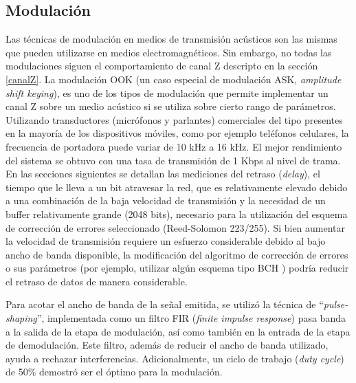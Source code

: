 \subsection{Modulación}
Las técnicas de modulación en medios de transmisión acústicos son las mismas que pueden utilizarse en medios electromagnéticos.
Sin embargo, no todas las modulaciones siguen el comportamiento de canal Z descripto en la sección \ref{canalZ}.
La modulación OOK (un caso especial de modulación ASK, \textit{amplitude shift keying}), es uno de los tipos de modulación que permite implementar un canal Z sobre un medio acústico si se utiliza sobre cierto rango de parámetros. Utilizando transductores (micrófonos y parlantes) comerciales del tipo presentes en la mayoría de los dispositivos móviles, como por ejemplo teléfonos celulares, la frecuencia de portadora puede variar de 10 kHz a 16 kHz. El mejor rendimiento del sistema se obtuvo con una tasa de transmisión de 1 Kbps al nivel de trama. En las secciones siguientes se detallan las mediciones del retraso (\textit{delay}), el tiempo que le lleva a un bit atravesar la red, que es relativamente elevado debido a una combinación de la baja velocidad de transmisión y la necesidad de un buffer relativamente grande (2048 bits), necesario para la utilización del esquema de corrección de errores seleccionado (Reed-Solomon 223/255). Si bien aumentar la velocidad de transmisión requiere un esfuerzo considerable debido al bajo ancho de banda disponible, la modificación del algoritmo de corrección de errores o sus parámetros (por ejemplo, utilizar algún esquema tipo BCH \cite{bose1960class}) podría reducir el retraso de datos de manera considerable.

Para acotar el ancho de banda de la señal emitida, se utilizó la técnica de ``\textit{pulse-shaping}'', implementada como un filtro FIR \cite{oppenheim1989discrete} (\textit{finite impulse response}) pasa banda a la salida de la etapa de modulación, así como también en la entrada de la etapa de demodulación. Este filtro, además de reducir el ancho de banda utilizado, ayuda a rechazar interferencias.
Adicionalmente, un ciclo de trabajo (\textit{duty cycle}) de 50\% demostró ser el óptimo para la modulación.

